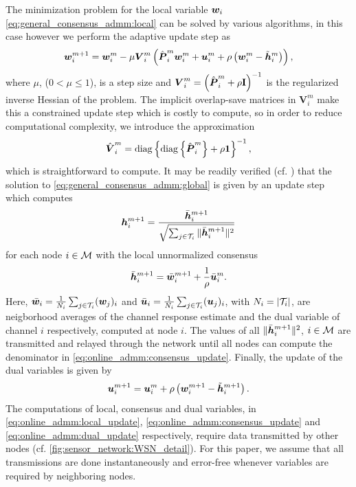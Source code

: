 \documentclass{article}
\begin{document}
The minimization problem for the local variable \({\bm{w}}_i\) \eqref{eq:general_consensus_admm:local} can be solved by various algorithms, in this case however we perform the adaptive update step as
\begin{equation}
    {\bm{w}}_i^{m+1} = {\bm{w}}_i^{m} - \mu \bm{{V}}_i^m \left( \hat{{\bm{{P}}}}_i^m {\bm{w}}_i^m + {\bm{u}}_i^m + \rho\left({\bm{w}}_i^m - \tilde{{\bm{h}}}_i^{m}\right)\right),\label{eq:online_admm:local_update}
\end{equation}
where \(\mu\), (\(0  < \mu\leq 1\)), is a step size and \(\bm{{V}}_i^m = \left(\hat{{\bm{{P}}}}_i^m + \rho \bm{\mathrm{I}} \right)^{-1}\) is the regularized inverse Hessian of the problem.
The implicit overlap-save matrices in \(\bm{{V}}_i^m\) make this a constrained update step which is costly to compute, so in order to reduce computational complexity, we introduce the approximation
\begin{equation}
    \hat{\bm{{V}}}_i^m = \operatorname{diag} \left\{ \operatorname{diag} \left\{ \hat{{\bm{{P}}}}_i^m \right\} + \rho \bm{\mathrm{1}} \right\}^{-1},
\end{equation}
which is straightforward to compute.
It may be readily verified (cf. \cite{boydDistributedOptimizationStatistical2011}) that the solution to \eqref{eq:general_consensus_admm:global} is given by an update step which computes
\begin{equation}
    {\bm{h}}_i^{m+1} = \frac{\bar{{\bm{h}}}_i^{m+1}}{\sqrt{\sum_{j \in \mathcal{T}_i} \|\bar{{\bm{h}}}_i^{m+1}\|^2}}\label{eq:online_admm:consensus_update}
\end{equation}
for each node \(i \in \mathcal{M}\) with the local unnormalized consensus
\begin{equation}
    \bar{{\bm{h}}}_i^{m+1} = \bar{{\bm{w}}}_i^{m+1} + \frac{1}{\rho} \bar{{\bm{u}}}_i^{m}.
\end{equation}
Here, \(\bar{{\bm{w}}}_i = \frac{1}{N_i} \sum_{j \in \mathcal{T}_i} ({\bm{w}}_j)_i\) and \(\bar{{\bm{u}}}_i = \frac{1}{N_i} \sum_{j \in \mathcal{T}_i} ({\bm{u}}_j)_i\), with \(N_i = | \mathcal{T}_i |\), are neigborhood averages of the channel response estimate and the dual variable of channel \(i\) respectively, computed at node \(i\). The values of all \(\|\bar{{\bm{h}}}_i^{m+1}\|^2\), \(i \in \mathcal{M}\) are transmitted and relayed through the network until all nodes can compute the denominator in \eqref{eq:online_admm:consensus_update}.
Finally, the update of the dual variables is given by
\begin{equation}
    {\bm{u}}_i^{m+1} = {\bm{u}}_i^{m} + \rho \left( {\bm{w}}_i^{m+1} - \tilde{{\bm{h}}}_i^{m+1} \right).\label{eq:online_admm:dual_update}
\end{equation}
The computations of local, consensus and dual variables, in \eqref{eq:online_admm:local_update}, \eqref{eq:online_admm:consensus_update} and \eqref{eq:online_admm:dual_update} respectively, require data transmitted by other nodes (cf. \autoref{fig:sensor_network:WSN_detail}). For this paper, we assume that all transmissions are done instantaneously and error-free whenever variables are required by neighboring nodes.
\end{document}
